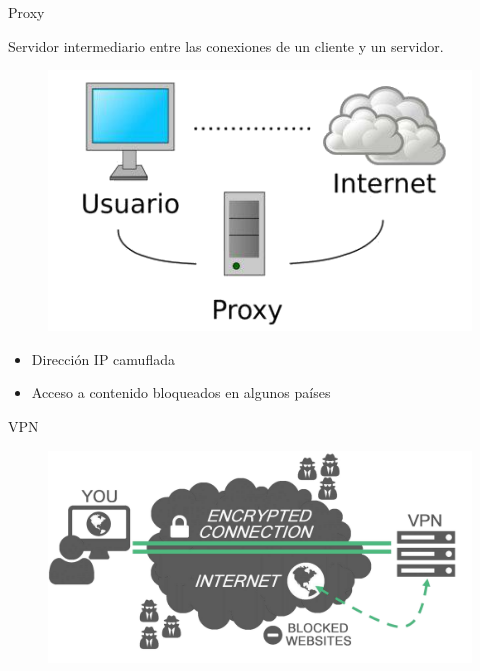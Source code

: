 \documentclass[spanish]{beamer}
\begin{document}
\begin{frame}{Proxy}
	
Servidor intermediario entre las conexiones de un cliente y un servidor. \\

\begin{figure}[h]
 	\centering
 	\includegraphics[width=.5\textwidth]{img/proxy}
\end{figure}


\begin{itemize}
	\item Dirección IP camuflada \\
	\item Acceso a contenido bloqueados en algunos países \\ 
\end{itemize}
	
\end{frame}

\begin{frame}{VPN}
 	\begin{figure}[h]
 		\centering
 		\includegraphics[width=.75\textwidth]{img/vpn}
 	\end{figure}
 \end{frame}
\end{document}
